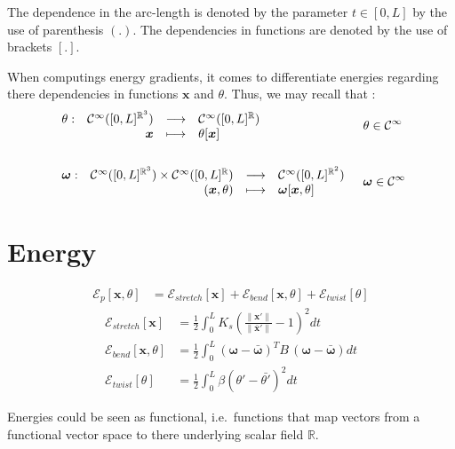 The dependence in the arc-length is denoted by the parameter $t \in [0,L]$ by the use of parenthesis $(.)$.
The dependencies in functions are denoted by the use of brackets $[.]$.

When computings energy gradients, it comes to differentiate energies regarding there dependencies in functions $\boldsymbol{x}$ and $\theta$. Thus, we may recall that :
\begin{align}
	&\begin{array}{lrcl} \theta: & \mathcal{C}^{\infty}([0,L]^{\mathbb{R}^3}) & \longrightarrow & \mathcal{C}^{\infty}([0,L]^\mathbb{R}) \\ & \boldsymbol{x} & \longmapsto & \theta[\boldsymbol{x}] \end{array}
	&&\theta \in \mathcal{C}^{\infty}
	\\ \notag\\
	&\begin{array}{lrcl} \boldsymbol{\omega}: & \mathcal{C}^{\infty}([0,L]^{\mathbb{R}^3}) \times \mathcal{C}^{\infty}([0,L]^{\mathbb{R}}) & \longrightarrow & \mathcal{C}^{\infty}([0,L]^{\mathbb{R}^2}) \\ & (\boldsymbol{x},\theta) & \longmapsto & \boldsymbol{\omega}[\boldsymbol{x},\theta] \end{array}
	&&\boldsymbol{\omega} \in \mathcal{C}^{\infty}
\end{align}





\section{Energy}

\begin{align}
\mathcal{E}_p[\boldsymbol{x},\theta] & = \mathcal{E}_{stretch}[\boldsymbol{x}] + \mathcal{E}_{bend}[\boldsymbol{x},\theta] + \mathcal{E}_{twist}[\theta]
\end{align}
\begin{align}
\mathcal{E}_{stretch}[\boldsymbol{x}] & = \tfrac{1}{2} \int_{0}^{L} K_s(\tfrac{\|\boldsymbol{x}'\|}{\|\bar{\boldsymbol{x}}'\|}-1)^2dt \\
\mathcal{E}_{bend}[\boldsymbol{x},\theta] & = \tfrac{1}{2} \int_{0}^{L} (\boldsymbol\omega -\boldsymbol{\bar{\omega}})^T B \, (\boldsymbol\omega -\boldsymbol{\bar{\omega}})dt \\
\mathcal{E}_{twist}[\theta] & = \tfrac{1}{2} \int_{0}^{L} \beta(\theta' -{\bar{\theta'}})^2dt
\end{align}

Energies could be seen as functional, i.e.\ functions that map vectors from a functional vector space to there underlying scalar field $\mathbb{R}$.

